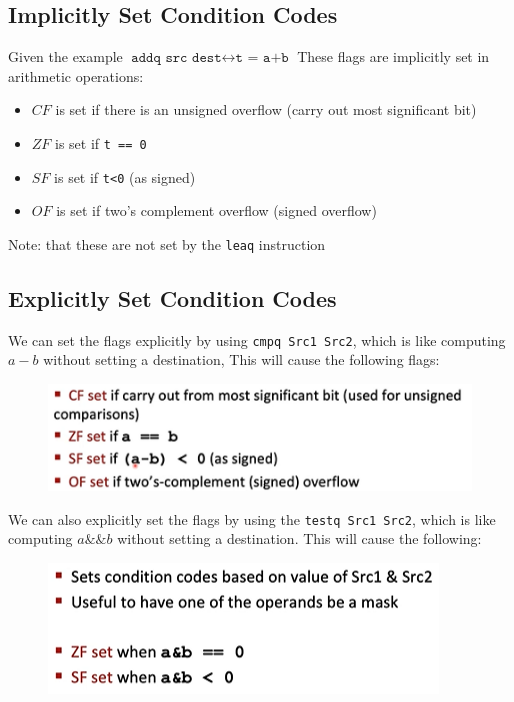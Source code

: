 \documentclass[12pt]{book}
\begin{document}
\subsection*{Implicitly Set Condition Codes}
Given the example $\texttt{addq src dest}\leftrightarrow \texttt{t = a+b}$ These flags are implicitly set in arithmetic operations:
\begin{itemize}
        \item $CF$ is set if there is an unsigned overflow (carry out most significant bit)
        \item $ZF$ is set if \texttt{t == 0} 
        \item $SF$ is set if  \texttt{t<0} (as signed)
        \item $OF$ is set if two's complement overflow (signed overflow)
\end{itemize}

Note: that these are not set by the \texttt{leaq} instruction

\subsection*{Explicitly Set Condition Codes}
We can set the flags explicitly by using \texttt{cmpq Src1 Src2}, which is like computing $a-b$ without setting a destination,
This will cause the following flags:
 \begin{figure}[h]
         \centering
         \includegraphics{./figures/explFlags}
 \end{figure}
\pagebreak


We can also explicitly set the flags by using the \texttt{testq Src1 Src2}, which is like computing $a\&\&b$ without setting a 
 destination.
 This will cause the following:
 \begin{figure}[h]
         \centering
         \includegraphics{./figures/explFlags2}
 \end{figure}
\end{document}

